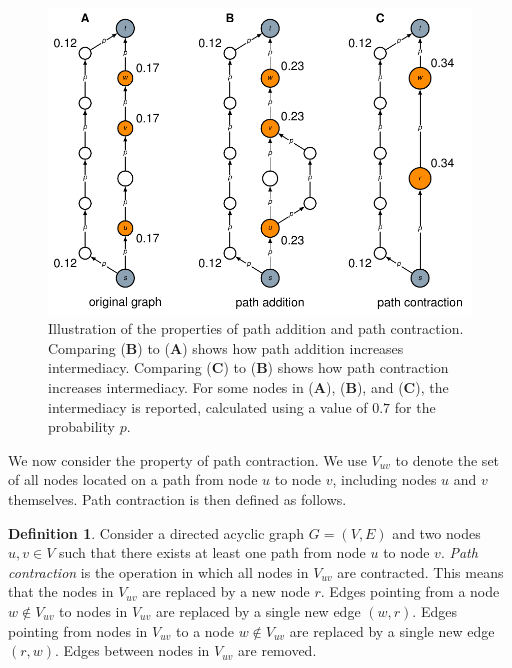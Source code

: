\documentclass[9pt,twocolumn,twoside]{pnas-alt} %
\theoremstyle{definition}
\newtheorem{definition}{Definition}
\begin{document}
\begin{sansmath}\begin{figure}[t]
  \centering%
  \includegraphics[width=\linewidth]{properties}
  \caption{Illustration of the properties of path addition and path contraction. Comparing (\textbf{B}) to (\textbf{A}) shows how path addition increases intermediacy. Comparing (\textbf{C}) to (\textbf{B}) shows how path contraction increases intermediacy. For some nodes in (\textbf{A}), (\textbf{B}), and (\textbf{C}), the intermediacy is reported, calculated using a value of $0.7$ for the probability $p$.}
  \label{fig:properties}
\end{figure}\end{sansmath}

We now consider the property of path contraction. We use $V_{uv}$ to denote the set of all nodes located on a path from node $u$ to node $v$, including nodes $u$ and $v$ themselves. Path contraction is then defined as follows.

\begin{definition}
    Consider a directed acyclic graph $G = (V, E)$ and two nodes $u, v \in V$ such that there exists at least one path from node $u$ to node $v$. \emph{Path contraction} is the operation in which all nodes in $V_{uv}$ are contracted. This means that the nodes in $V_{uv}$ are replaced by a new node $r$. Edges pointing from a node $w \notin V_{uv}$ to nodes in $V_{uv}$ are replaced by a single new edge $(w, r)$. Edges pointing from nodes in $V_{uv}$ to a node $w \notin V_{uv}$ are replaced by a single new edge $(r, w)$. Edges between nodes in $V_{uv}$ are removed.
\end{definition}
\end{document}
